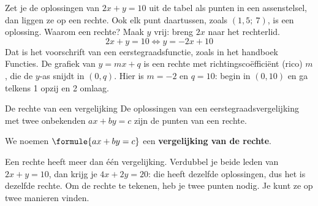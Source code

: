 Zet je de oplossingen van $2x + y = 10$ uit de tabel als punten in een assenstelsel, dan liggen ze op een rechte. Ook elk punt daartussen, zoals $(1{,}5;\ 7)$, is een oplossing. Waarom een rechte? Maak $y$ vrij: breng $2x$ naar het rechterlid.
\[ 2x + y = 10 \iff y = -2x + 10 \]
Dat is het voorschrift van een eerstegraadsfunctie, zoals in het handboek Functies. De grafiek van $y = mx + q$ is een rechte met richtingscoëfficiënt (rico) $m$, die de $y$-as snijdt in $(0, q)$. Hier is $m = -2$ en $q = 10$: begin in $(0, 10)$ en ga telkens 1 opzij en 2 omlaag.


\begin{theorie}
\begin{stelling}{De rechte van een vergelijking}
De oplossingen van een eerstegraadsvergelijking met twee onbekenden $ax + by = c$ zijn de punten van een rechte.
\end{stelling}
We noemen $\formule{ax + by = c}$ een \textbf{\textcolor{accent}{vergelijking van de rechte}}.
\end{theorie}

Een rechte heeft meer dan één vergelijking. Verdubbel je beide leden van $2x + y = 10$, dan krijg je $4x + 2y = 20$: die heeft dezelfde oplossingen, dus het is dezelfde rechte. Om de rechte te tekenen, heb je twee punten nodig. Je kunt ze op twee manieren vinden.


